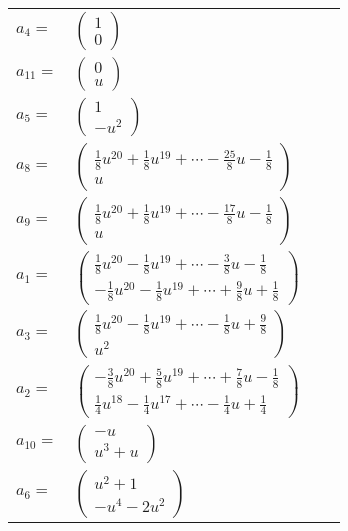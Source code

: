 \documentclass[1p]{elsarticle_modified}
\theoremstyle{definition}
\begin{document}
\begin{tabular}{m{7pt} m{180pt} m{7pt} m{180pt} }
\flushright $a_{4}=$&$\begin{pmatrix}1\\0\end{pmatrix}$ \\
\flushright $a_{11}=$&$\begin{pmatrix}0\\u\end{pmatrix}$ \\
\flushright $a_{5}=$&$\begin{pmatrix}1\\- u^2\end{pmatrix}$ \\
\flushright $a_{8}=$&$\begin{pmatrix}\frac{1}{8} u^{20}+\frac{1}{8} u^{19}+\cdots-\frac{25}{8} u-\frac{1}{8}\\u\end{pmatrix}$ \\
\flushright $a_{9}=$&$\begin{pmatrix}\frac{1}{8} u^{20}+\frac{1}{8} u^{19}+\cdots-\frac{17}{8} u-\frac{1}{8}\\u\end{pmatrix}$ \\
\flushright $a_{1}=$&$\begin{pmatrix}\frac{1}{8} u^{20}-\frac{1}{8} u^{19}+\cdots-\frac{3}{8} u-\frac{1}{8}\\-\frac{1}{8} u^{20}-\frac{1}{8} u^{19}+\cdots+\frac{9}{8} u+\frac{1}{8}\end{pmatrix}$ \\
\flushright $a_{3}=$&$\begin{pmatrix}\frac{1}{8} u^{20}-\frac{1}{8} u^{19}+\cdots-\frac{1}{8} u+\frac{9}{8}\\u^2\end{pmatrix}$ \\
\flushright $a_{2}=$&$\begin{pmatrix}-\frac{3}{8} u^{20}+\frac{5}{8} u^{19}+\cdots+\frac{7}{8} u-\frac{1}{8}\\\frac{1}{4} u^{18}-\frac{1}{4} u^{17}+\cdots-\frac{1}{4} u+\frac{1}{4}\end{pmatrix}$ \\
\flushright $a_{10}=$&$\begin{pmatrix}- u\\u^3+u\end{pmatrix}$ \\
\flushright $a_{6}=$&$\begin{pmatrix}u^2+1\\- u^4-2 u^2\end{pmatrix}$ \\

\end{tabular}
\end{document}
